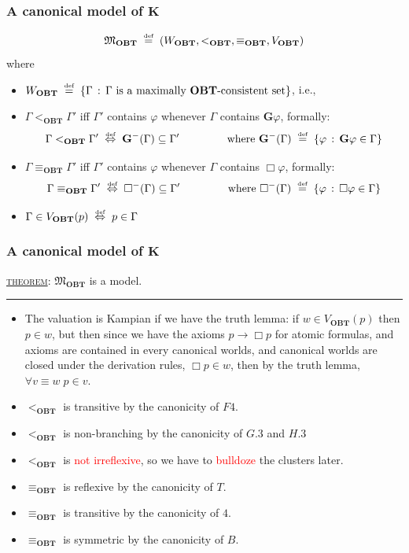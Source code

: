 \documentclass[xcolor=x11names]{beamer}
\newcommand{\cemph}[1]{\textcolor{red}{#1}}
\newcommand{\FB}{\mathbf G}
\newcommand{\dzsa}[1]{\textsc{\underline{#1}}:}
\newcommand{\defegy}[1][.1]{\hspace{#1cm}\overset{\textup{\tiny def}}{=}\hspace{#1cm}}
\newcommand{\defekv}[1][.1]{\hspace{#1cm}\overset{\textup{\tiny def}}{ \Leftrightarrow }\hspace{#1cm}}
\newcommand{\lthen}{\rightarrow}
\begin{document}
\begin{frame}
\frametitle{A canonical model of $\mathbf K$}

\[\mathfrak M_{\mathbf {OBT}} \defegy \left( W_{\mathbf {OBT}}, <_{ \mathbf {OBT}}, \equiv_{ \mathbf {OBT}}, V_{\mathbf {OBT}}\right)   \]
where
\begin{itemize}
\item $W_{\mathbf {OBT}} \defegy \{\Gamma \, :\, \textup{$\Gamma$  is a maximally $\mathbf {OBT}$-consistent set} \}$, i.e.,
\item $\Gamma <_{\mathbf {OBT}}\Gamma'$ iff $\Gamma'$ contains $\varphi$ whenever $\Gamma$ contains $\FB \varphi$, formally:
 \[ \Gamma <_{\mathbf {OBT}}\Gamma' \defekv \FB^-(\Gamma )\subseteq \Gamma' \qquad \qquad \textup{ where }\FB^-(\Gamma)\defegy \{\varphi \, : \, \FB \varphi \in \Gamma\}\]
\item $\Gamma \equiv_{\mathbf {OBT}}\Gamma'$ iff $\Gamma'$ contains $\varphi$ whenever $\Gamma$ contains $\Box \varphi$, formally:
 \[ \Gamma \equiv_{\mathbf {OBT}}\Gamma' \defekv \Box^-(\Gamma )\subseteq \Gamma' \qquad \qquad \textup{ where }\Box^-(\Gamma)\defegy \{\varphi \, : \, \Box \varphi \in \Gamma\}\]
\item $\Gamma \in V_{\mathbf {OBT}}(p) \defekv p\in \Gamma$
\end{itemize}
\end{frame}
\begin{frame}
\frametitle{A canonical model of $\mathbf K$}
\dzsa{theorem} $\mathfrak M_{\mathbf {OBT}}$ is a model.
\medskip
\hrule
\medskip

\begin{itemize}
\item The valuation is Kampian if we have the truth lemma: if $w\in V_{\mathbf {OBT}}(p)$ then $p\in w$, but then since we have the axioms $p\lthen \Box p$ for atomic formulas, and axioms are contained in every canonical worlds, and canonical worlds are closed under the derivation rules, $\Box p\in w$, then by the truth lemma, $\forall v\equiv w\; p\in v$.
\item $<_{\mathbf {OBT}}$ is transitive by the canonicity of $F4$.
\item $<_{\mathbf {OBT}}$ is non-branching by the canonicity of $G.3$ and $H.3$
\item $<_{\mathbf {OBT}}$ is \cemph{not irreflexive}, so we have to \cemph{bulldoze} the clusters later.
\item $\equiv_{\mathbf {OBT}}$ is reflexive by the canonicity of $T$.
\item $\equiv_{\mathbf {OBT}}$ is transitive by the canonicity of $4$.
\item $\equiv_{\mathbf {OBT}}$ is symmetric by the canonicity of $B$.
\end{itemize}

\end{frame}
\end{document}
